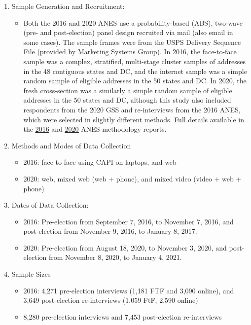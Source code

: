 \documentclass[12pt]{article}
\begin{document}
\begin{appendices}
\begin{refsection}
\begin{enumerate}
	\item Sample Generation and Recruitment:
	\begin{itemize}
		\item Both the 2016 and 2020 ANES use a probability-based (ABS), two-wave (pre- and post-election) panel design recruited via mail (also email in some cases). The sample frames were from the USPS Delivery Sequence File (provided by Marketing Systems Group). In 2016, the face-to-face sample was a complex, stratified, multi-stage cluster samples of addresses in the 48 contiguous states and DC, and the internet sample was a simple random sample of eligible addresses in the 50 states and DC. In 2020, the fresh cross-section was a similarly a simple random sample of eligible addresses in the 50 states and DC, although this study also included respondents from the 2020 GSS and re-interviews from the 2016 ANES, which were selected in slightly different methods. Full details available in the \href{https://electionstudies.org/wp-content/uploads/2016/02/anes_timeseries_2016_methodology_report.pdf}{\underline{2016}} and \href{https://electionstudies.org/wp-content/uploads/2022/08/anes_timeseries_2020_methodology_report.pdf}{\underline{2020}} ANES methodology reports. 
	\end{itemize}
	
	\item Methods and Modes of Data Collection
	\begin{itemize}
		\item 2016: face-to-face using CAPI on laptops, and web
		\item 2020: web, mixed web (web $+$ phone), and mixed video (video $+$ web $+$ phone)
	\end{itemize}
	
	\item Dates of Data Collection:
	\begin{itemize}
		\item 2016: Pre-election from September 7, 2016, to November 7, 2016, and post-election from November 9, 2016, to January 8, 2017.
		\item 2020: Pre-election from August 18, 2020, to November 3, 2020, and post-election from November 8, 2020, to January 4, 2021.
	\end{itemize}
	
	\item Sample Sizes
	\begin{itemize}
		\item 2016: 4,271 pre-election interviews (1,181 FTF and 3,090 online), and 3,649 post-election re-interviews (1,059 FtF, 2,590 online)
		\item 8,280 pre-election interviews and 7,453 post-election re-interviews
	\end{itemize}
	

\end{enumerate}
\end{refsection}
\end{appendices}
\end{document}
